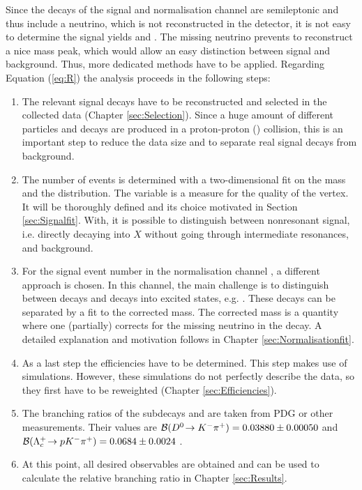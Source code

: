 Since the decays of the signal and normalisation channel are semileptonic and thus include a neutrino, which is not reconstructed in the detector, it is not easy to determine the signal yields \NDp and \NLc.
The missing neutrino prevents to reconstruct a nice \Lb mass peak, which would allow an easy distinction between signal and background.
Thus, more dedicated methods have to be applied.
Regarding Equation (\ref{eq:R}) the analysis proceeds in the following steps:
\begin{enumerate}
    \item The relevant signal decays have to be reconstructed and selected in the collected data (Chapter \ref{sec:Selection}). 
          Since a huge amount of different particles and decays are produced in a proton-proton (\proton\proton) collision, this is an important step to reduce the data size and to separate real signal decays from background.
    \item The number of \LbToDpmunuX events \NLc is determined with a two-dimensional fit on the \Dz\proton mass and the \logIP distribution.
          The variable \logIP  is a measure for the quality of the \Dz\proton\mun vertex.
          It will be thoroughly defined and its choice motivated in Section \ref{sec:Signalfit}.
          With, \logIP it is possible to distinguish between nonresonant signal, i.e. \Lb directly decaying into \Dz\proton\mun\neumb$X$ without going through intermediate resonances, and background.
    \item For the signal event number \NLc in the normalisation channel \LbToLcmunu, a different approach is chosen.
          In this channel, the main challenge is to distinguish between \LbToLcmunu decays and decays into excited \Lc states, e.g. .
          These decays can be separated by a fit to the corrected \Lb mass.
          The corrected mass is a quantity where one (partially) corrects for the missing neutrino in the decay.
          A detailed explanation and motivation follows in Chapter \ref{sec:Normalisationfit}.
    \item As a last step the efficiencies have to be determined.
          This step makes use of simulations.
          However, these simulations do not perfectly describe the data, so they first have to be reweighted (Chapter \ref{sec:Efficiencies}).
    \item The branching ratios of the subdecays \DToKpi and \LcTopKpi are taken from PDG or other measurements. 
          Their values are ${\cal B}({{D}^0}\!\rightarrow {\ensuremath{{K}^-}}{\ensuremath{{\pi}^+}}) = 0.03880 \pm 0.00050$ \cite{PDG} and ${\cal B}({{\Lambda}^+_{c}}\!\rightarrow {\ensuremath{p}}{\ensuremath{{K}^-}}{\ensuremath{{\pi}^+}}) = 0.0684 \pm 0.0024$ \cite{Belle_BR_LcTopKpi}.
    \item At this point, all desired observables are obtained and can be used to calculate the relative branching ratio \R in Chapter \ref{sec:Results}.
\end{enumerate}

